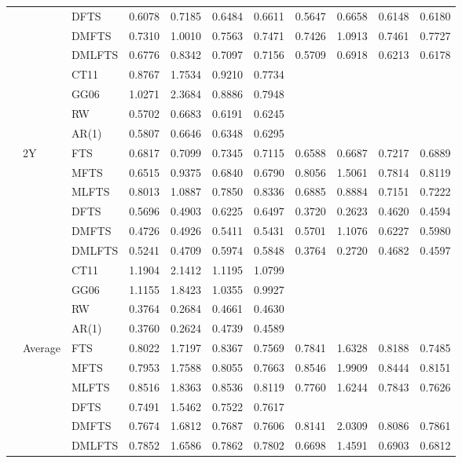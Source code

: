 \documentclass[12pt,a4paper]{article}
\def\textBF#1{\sbox\CBox{#1}\resizebox{\wd\CBox}{\ht\CBox}{\textbf{#1}}}
\begin{document}
\begin{center}
\begin{small}
\begin{longtable}{@{}lllcccccccc@{}}
& & DFTS & 0.6078 & 0.7185 & 0.6484 & 0.6611 & 0.5647 & 0.6658 & 0.6148 & 0.6180 \\ 
& & DMFTS & 0.7310 & 1.0010 & 0.7563 & 0.7471 & 0.7426 & 1.0913 & 0.7461 & 0.7727 \\ 
& & DMLFTS & 0.6776 & 0.8342 & 0.7097 & 0.7156 & 0.5709 & 0.6918 & 0.6213 & 0.6178 \\
& & CT11 & 0.8767 & 1.7534 & 0.9210 & 0.7734 \\
& & GG06 & 1.0271 & 2.3684 & 0.8886 & 0.7948 \\
& & RW & 0.5702 & 0.6683 & 0.6191 & 0.6245 \\
& & AR(1) & 0.5807 & 0.6646 & 0.6348 & 0.6295 \\
 \cmidrule{2-11}
   & 2Y & FTS & 0.6817 & 0.7099 & 0.7345 & 0.7115 & 0.6588 & 0.6687 & 0.7217 & 0.6889 \\ 
& & MFTS & 0.6515 & 0.9375 & 0.6840 & 0.6790 & 0.8056 & 1.5061 & 0.7814 & 0.8119 \\ 
& & MLFTS & 0.8013 & 1.0887 & 0.7850 & 0.8336 & 0.6885 & 0.8884 & 0.7151 & 0.7222  \\
& & DFTS & 0.5696 & 0.4903 & 0.6225 & 0.6497 & 0.3720 & 0.2623 & 0.4620 & 0.4594 \\ 
& & DMFTS & 0.4726 & 0.4926 & 0.5411 & 0.5431 & 0.5701 & 1.1076 & 0.6227 & 0.5980 \\ 
& & DMLFTS & 0.5241 & 0.4709 & 0.5974 & 0.5848 & 0.3764 & 0.2720 & 0.4682 & 0.4597 \\
& & CT11 & 1.1904 & 2.1412 & 1.1195 & 1.0799 \\
& & GG06 & 1.1155 & 1.8423 & 1.0355 & 0.9927 \\
& & RW & 0.3764 & 0.2684 & 0.4661 & 0.4630 \\
& & AR(1) & 0.3760 & 0.2624 & 0.4739 & 0.4589 \\
  \cmidrule{2-11}
  & Average & FTS & 0.8022 & 1.7197 & 0.8367 & 0.7569 & 0.7841 & 1.6328 & 0.8188 & 0.7485 \\
  & & MFTS & 0.7953 & 1.7588 & 0.8055 & 0.7663 & 0.8546 & 1.9909 & 0.8444 & 0.8151 \\
  & & MLFTS & 0.8516 & 1.8363 & 0.8536 & 0.8119 & 0.7760 & 1.6244 & 0.7843 & 0.7626\\
 & & DFTS & 0.7491 & 1.5462 & 0.7522 & 0.7617 & \textBF{0.6651} & \textBF{1.4468} & \textBF{0.6847} & \textBF{0.6803} \\
    & & DMFTS & 0.7674 & 1.6812 & 0.7687 & 0.7606 & 0.8141 & 2.0309 & 0.8086 & 0.7861 \\
  & & DMLFTS & 0.7852 & 1.6586 & 0.7862 & 0.7802 & 0.6698 & 1.4591 & 0.6903 & 0.6812 \\

\end{longtable}
\end{small}
\end{center}
\end{document}
